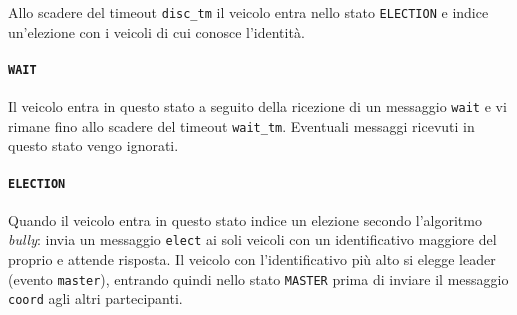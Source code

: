 \documentclass{memoir}
\begin{document}
Allo scadere del timeout \texttt{disc\_tm} il veicolo entra nello stato
\texttt{ELECTION} e indice un'elezione con i veicoli di cui conosce l'identità.

\paragraph{\texttt{WAIT}}
Il veicolo entra in questo stato a seguito della ricezione di un messaggio
\texttt{wait} e vi rimane fino allo scadere del timeout \texttt{wait\_tm}.
Eventuali messaggi ricevuti in questo stato vengo ignorati.

\begin{figure}[h]
  \centering
\end{figure}

\paragraph{\texttt{ELECTION}}
Quando il veicolo entra in questo stato indice un elezione secondo l'algoritmo
\emph{bully}: invia un messaggio \texttt{elect} ai soli veicoli con un
identificativo maggiore del proprio e attende risposta. Il veicolo con
l'identificativo più alto si elegge leader (evento \texttt{master}), entrando
quindi nello stato \texttt{MASTER} prima di inviare il messaggio \texttt{coord}
agli altri partecipanti.

\begin{figure}[h]
  \centering
\end{figure}
\end{document}

